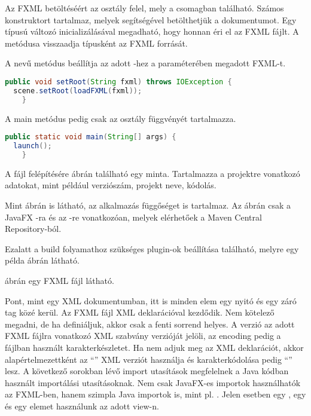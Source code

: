 Az FXML betöltéséért az  osztály felel, mely a  csomagban található.
Számos konstruktort tartalmaz, melyek segítségével betölthetjük a dokumentumot.
Egy  típusú változó inicializálásával megadható, hogy honnan éri el az FXML fájlt.
A  metódusa visszaadja  típusként az FXML forrását.

A  nevű metódus beállítja az adott -hez a paraméterében megadott FXML-t.

\begin{lstlisting}[language=Java]
public void setRoot(String fxml) throws IOException {
  scene.setRoot(loadFXML(fxml));
    }
\end{lstlisting}
 

A main metódus pedig csak az  osztály  függvényét tartalmazza. 

\begin{lstlisting}[language=Java]
public static void main(String[] args) {
  launch();
    }
\end{lstlisting}

A  fájl felépítésére  ábrán található egy minta.
Tartalmazza a projektre vonatkozó adatokat, mint például verziószám, projekt neve, kódolás. 
 

 
Mint  ábrán is látható, az alkalmazás függőséget is tartalmaz.
Az ábrán csak a JavaFX -ra és az -re vonatkozóan, melyek elérhetőek a Maven Central Repository-ból. 
  

Ezalatt a build folyamathoz szükséges plugin-ok beállítása található, melyre egy példa  ábrán látható.




 ábrán egy FXML fájl látható.

 
Pont, mint egy XML dokumentumban, itt is minden elem egy nyitó és egy záró tag közé kerül.
Az FXML fájl XML deklarációval kezdődik.
Nem kötelező megadni, de ha definiáljuk, akkor csak a fenti sorrend helyes.
A verzió az adott FXML fájlra vonatkozó XML szabvány verzióját jelöli, az encoding pedig a fájlban használt karakterkészletet.
Ha nem adjuk meg az XML deklarációt, akkor alapértelmezettként az “” XML verziót használja és karakterkódolása pedig “” lesz.
A következő sorokban lévő import utasítások megfelelnek a Java kódban használt importálási utasításoknak.
Nem csak JavaFX-es importok használhatók az FXML-ben, hanem szimpla Java importok is, mint pl. .
Jelen esetben egy , egy  és egy  elemet használunk az adott view-n. 
 
